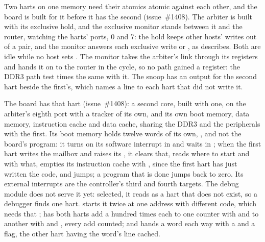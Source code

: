 \documentclass[journal,onecolumn,9pt]{IEEEtran}
\begin{document}
Two harts on one memory need their atomics atomic against each other,
and the board is built for it before it has the second
(issue~\#1408). The arbiter is built with its exclusive hold, and the
exclusive monitor stands between it and the router, watching the
harts' ports, 0 and 7: the hold keeps other hosts' writes out of a
pair, and the monitor answers each exclusive write  or
, as  describes. Both are idle while no
host sets . The monitor takes the arbiter's link through its
registers and hands it on to the router in the cycle, so no path
gained a register: the DDR3 path test times the same with it. The
snoop has an output for the second hart beside the first's, which
names a line to each hart that did not write it.

The board has that hart (issue~\#1408): a second core, built with
 one, on the arbiter's eighth port with a tracker of its
own, and its own boot memory, data memory, instruction cache and data
cache, sharing the DDR3 and the peripherals with the first. Its boot
memory holds twelve words of its own, , and not the board's
program: it turns on its software interrupt in  and waits in
; when the first hart writes the mailbox and raises its
, it clears that, reads where to start and with what, empties
its instruction cache with , since the first hart has just
written the code, and jumps; a program that is done jumps back to zero.
Its external interrupts are the controller's third and fourth targets.
The debug module does not serve it yet: selected, it reads as a hart
that does not exist, so a debugger finds one hart.
 starts it twice at one address with
different code, which needs that ; has both harts add a
hundred times each to one counter with  and to another
with  and , every add counted; and hands a word
each way with a  and a flag, the other hart having the
word's line cached.
\end{document}
